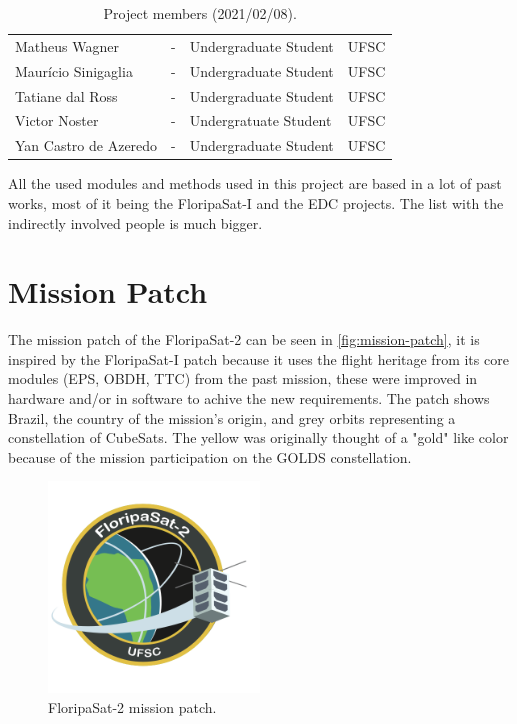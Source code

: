 \begin{table}[ht]
\begin{tabular}{lllc}
        Matheus Wagner                      & -         & Undergraduate Student & UFSC \\
        Maurício Sinigaglia                 & -         & Undergraduate Student & UFSC \\
        Tatiane dal Ross                    & -         & Undergraduate Student & UFSC \\
        Victor Noster                       & -         & Undergratuate Student & UFSC \\
        Yan Castro de Azeredo               & -         & Undergraduate Student & UFSC \\
        \bottomrule[1.5pt]
    \end{tabular}
    \caption{Project members (2021/02/08).}
    \label{tab:team-members}
\end{table}

All the used modules and methods used in this project are based in a lot of past works, most of it being the FloripaSat-I and the EDC projects. The list with the indirectly involved people is much bigger.

\section{Mission Patch}

The mission patch of the FloripaSat-2 can be seen in \autoref{fig:mission-patch}, it is inspired by the FloripaSat-I patch \cite{floripasat} because it uses the flight heritage from its core modules (EPS, OBDH, TTC) from the past mission, these were improved in hardware and/or in software to achive the new requirements. The patch shows Brazil, the country of the mission's origin, and grey orbits representing a constellation of CubeSats. The yellow was originally thought of a "gold" like color because of the mission participation on the GOLDS constellation.

\begin{figure}[!ht]
    \begin{center}
        \includegraphics[width=0.5\textwidth]{figures/floripasat2-patch.png}
        \caption{FloripaSat-2 mission patch.}
        \label{fig:mission-patch}
    \end{center}
\end{figure}
